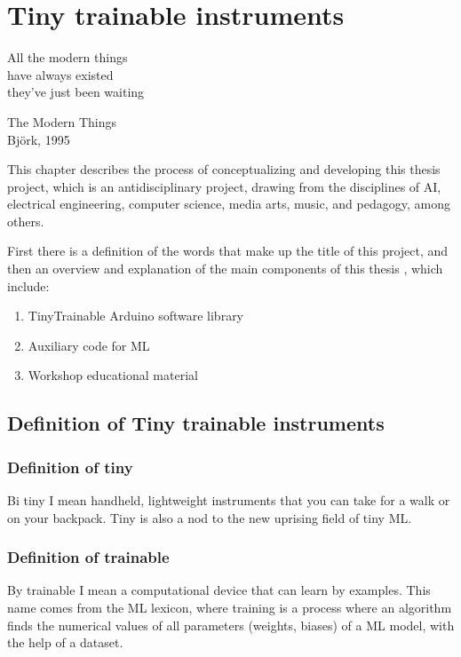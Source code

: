 \chapter{Tiny trainable instruments}

\epigraph{All the modern things \\ have always existed \\ they've just been waiting}{The Modern Things \\ Björk, 1995}

This chapter describes the process of conceptualizing and developing this thesis project, which is an antidisciplinary project, drawing from the disciplines of \acrshort{AI}, electrical engineering, computer science, media arts, music, and pedagogy, among others.

First there is a definition of the words that make up the title of this project, and then an overview and explanation of the main components of this thesis , which include:

\begin{enumerate}
  \item TinyTrainable Arduino software library
  \item Auxiliary code for \acrshort{ML}
  \item Workshop educational material
\end{enumerate}

\section{Definition of Tiny trainable instruments}

\subsection{Definition of tiny}

Bi tiny I mean handheld, lightweight instruments that you can take for a walk or on your backpack. Tiny is also a nod to the new uprising field of tiny \acrshort{ML}.

\subsection{Definition of trainable}

By trainable I mean a computational device that can learn by examples. This name comes from the \acrshort{ML} lexicon, where training is a process where an algorithm finds the numerical values of all parameters (weights, biases) of a \acrshort{ML} model, with the help of a dataset.


